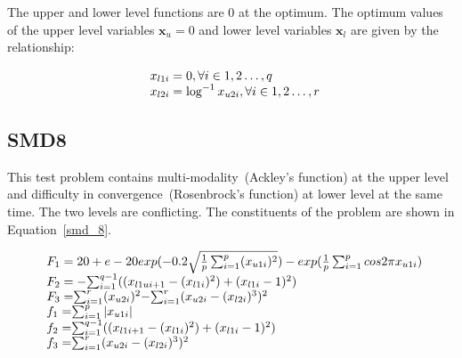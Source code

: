 The upper and lower level functions are 0 at the optimum. The optimum values of the upper level variables $\mathbf{x}_u=0$ and lower level variables $\mathbf{x}_l$ are given by the relationship: 

\begin{equation}
\begin{array}{lr}
\text{}\hspace{2mm} x_{l1i}=0,  \forall i \in {1,2\ldots,q} \\
\text{}\hspace{2mm} x_{l2i}=\log^{-1}x_{u2i} ,  \forall i \in {1,2\ldots,r} \\
\end{array}
\label{basic_7}
\end{equation}



\subsection{SMD8}

This test problem contains multi-modality~(Ackley's function) at the upper level and difficulty in convergence~(Rosenbrock's function) at lower level at the same time. The two levels are conflicting. The constituents of the problem are shown in Equation~\ref{smd_8}.

\begin{equation}
\begin{array}{lr}
$$\text{}\hspace{2mm} F_1=20+e-20 exp(-0.2 \sqrt{\frac{1}{p} \sum_{	i=1}^{p} (x_{u1i})^{2}}) -exp (\frac{1}{p}\sum_{	i=1}^{p} cos2 \pi x_{u1i}  )$$ \\
\text{}\hspace{2mm} F_2=-$$\sum_{	i=1}^{q-1} ((x_{l1ui+1}-(x_{l1i})^{2}) +(x_{l1i}-1)^{2})$$\\
\text{}\hspace{2mm} F_3=$$\sum_{	i=1}^{r} (x_{u2i})^{2} $$-$$\sum_{	i=1}^{r} (x_{u2i}- (x_{l2i})^{3})^{2} $$\\
\text{}\hspace{2mm} f_1=$$\sum_{	i=1}^{p} |x_{u1i}| $$\\
\text{}\hspace{2mm} f_2=$$\sum_{	i=1}^{q-1} ((x_{l1i+1}-(x_{l1i})^{2}) +(x_{l1i}-1)^{2})$$\\
\text{}\hspace{2mm} f_3=$$\sum_{	i=1}^{r} (x_{u2i}-(x_{l2i})^{3})^{2} $$\\
\end{array}
\label{smd_8}
\end{equation}

